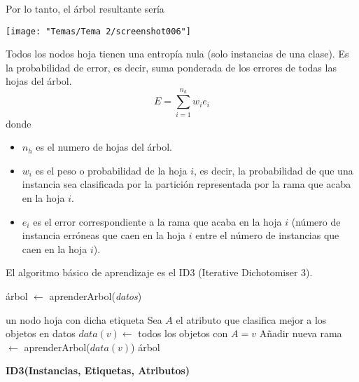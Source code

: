 Por lo tanto, el árbol resultante sería
\begin{center}
	\texttt{[image: "Temas/Tema 2/screenshot006"]}
\end{center}
Todos los nodos hoja tienen una entropía nula (solo instancias de una clase).
Es la probabilidad de error, es decir, suma ponderada de los errores de todas las hojas del árbol. \[ E=\sum_{i=1}^{n_h}w_ie_i \]donde
\begin{itemize}
	\item $n_h$ es el numero de hojas del árbol.
	\item $w_i$ es el peso o probabilidad de la hoja $i$, es decir, la probabilidad de que una instancia sea clasificada por la partición representada por la rama que acaba en la hoja $i$.
	\item $e_i$ es el error correspondiente a la rama que acaba en la hoja $i$ (número de instancia erróneas que caen en la hoja $i$ entre el número de instancias que caen en la hoja $i$).
\end{itemize}
El algoritmo básico de aprendizaje es el ID3 (Iterative Dichotomiser 3).

\begin{algorithm}
	\caption{árbol $\gets$ aprenderArbol(\textit{datos})}
	\begin{algorithmic}[1]
		\RETURN un nodo hoja con dicha etiqueta
		\ELSE
		\STATE Sea $A$ el atributo que clasifica mejor a los objetos en datos
		\STATE $data(v) \leftarrow$ todos los objetos con $A = v$
		\STATE Añadir nueva rama $\leftarrow$ aprenderArbol($data(v)$)
		\ENDFOR
		\RETURN árbol
		\ENDIF
	\end{algorithmic}
\end{algorithm}

\pagebreak

\textbf{ID3(Instancias, Etiquetas, Atributos)}

